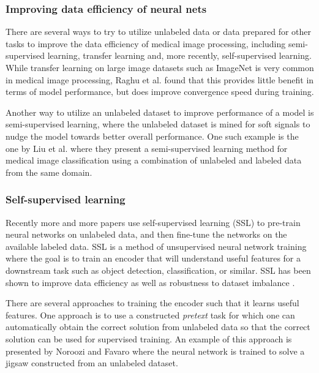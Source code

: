 \documentclass[conference]{IEEEtran}
\begin{document}
\subsubsection{Improving data efficiency of neural nets}

There are several ways to try to utilize unlabeled data or data prepared for other tasks to improve
the data efficiency of medical image processing, including semi-supervised learning, transfer learning
and, more recently, self-supervised learning. 
While transfer learning on large image datasets 
such as ImageNet is very common in medical image processing, 
Raghu et al. \cite{raghuTransfusionUnderstandingTransfer2019} found that
this provides little benefit in terms of model performance, but does
improve convergence speed during training.

Another way to utilize an unlabeled dataset to improve
performance of a model is semi-supervised learning, where the unlabeled
dataset is mined for soft signals to nudge the model towards better overall performance.
One such example is the one by Liu et al. \cite{liuSemisupervisedMedicalImage2020} where
they present a semi-supervised learning method for medical image classification using
a combination of unlabeled and labeled data from the same domain.

\subsubsection{Self-supervised learning}

Recently more and more papers use self-supervised learning (SSL) to pre-train neural networks on
unlabeled data, and then fine-tune the networks on the available labeled data.
SSL is a method of unsupervised neural network training where the
goal is to train an encoder that will understand useful features for a downstream
task such as object detection, classification, or similar. SSL has
been shown to improve data efficiency
\cite{chenSimpleFrameworkContrastive2020} as well as robustness to dataset imbalance
\cite{liuSelfsupervisedLearningMore2021}.

There are several approaches to training the encoder such that it learns useful features.
One approach is to use a constructed \textit{pretext} task for which one
can automatically obtain the correct solution from unlabeled data so that the correct solution can be used
for supervised training. An example of this approach is presented by Noroozi and Favaro 
\cite{norooziUnsupervisedLearningVisual2016} where the neural network is trained to 
solve a jigsaw constructed from an unlabeled dataset.
\end{document}

